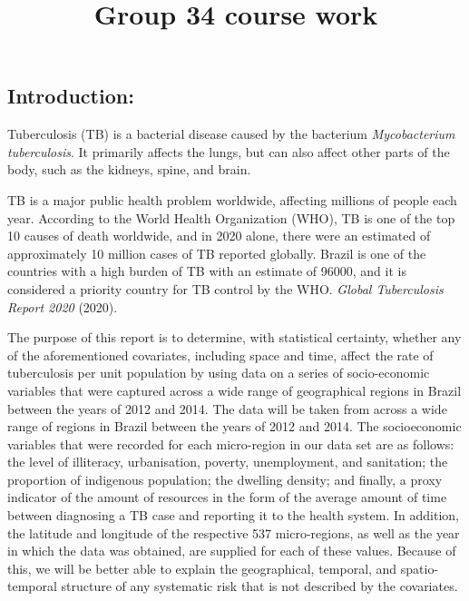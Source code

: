 \documentclass[
  letterpaper,
  DIV=11,
  numbers=noendperiod]{scrartcl}
\title{Group 34 course work}
\author{}
\date{}
\renewcommand*\contentsname{Table of contents}
\newcommand\contentsname{Table of contents}
\begin{document}
\maketitle
\ifdefined\Shaded\renewenvironment{Shaded}{\begin{tcolorbox}[borderline west={3pt}{0pt}{shadecolor}, enhanced, breakable, interior hidden, boxrule=0pt, frame hidden, sharp corners]}{\end{tcolorbox}}\fi

\renewcommand*\contentsname{Table of contents}
{
\hypersetup{linkcolor=}
\setcounter{tocdepth}{3}
\tableofcontents
}
\newpage{}

\hypertarget{introduction}{%
\subsection{Introduction:}\label{introduction}}

Tuberculosis (TB) is a bacterial disease caused by the bacterium
\emph{Mycobacterium tuberculosis}. It primarily affects the lungs, but
can also affect other parts of the body, such as the kidneys, spine, and
brain.

TB is a major public health problem worldwide, affecting millions of
people each year. According to the World Health Organization (WHO), TB
is one of the top 10 causes of death worldwide, and in 2020 alone, there
were an estimated of approximately 10 million cases of TB reported
globally. Brazil is one of the countries with a high burden of TB with
an estimate of 96000, and it is considered a priority country for TB
control by the WHO. \emph{Global Tuberculosis Report 2020} (2020).

The purpose of this report is to determine, with statistical certainty,
whether any of the aforementioned covariates, including space and time,
affect the rate of tuberculosis per unit population by using data on a
series of socio-economic variables that were captured across a wide
range of geographical regions in Brazil between the years of 2012 and
2014. The data will be taken from across a wide range of regions in
Brazil between the years of 2012 and 2014. The socioeconomic variables
that were recorded for each micro-region in our data set are as follows:
the level of illiteracy, urbanisation, poverty, unemployment, and
sanitation; the proportion of indigenous population; the dwelling
density; and finally, a proxy indicator of the amount of resources in
the form of the average amount of time between diagnosing a TB case and
reporting it to the health system. In addition, the latitude and
longitude of the respective 537 micro-regions, as well as the year in
which the data was obtained, are supplied for each of these values.
Because of this, we will be better able to explain the geographical,
temporal, and spatio-temporal structure of any systematic risk that is
not described by the covariates.
\end{document}
